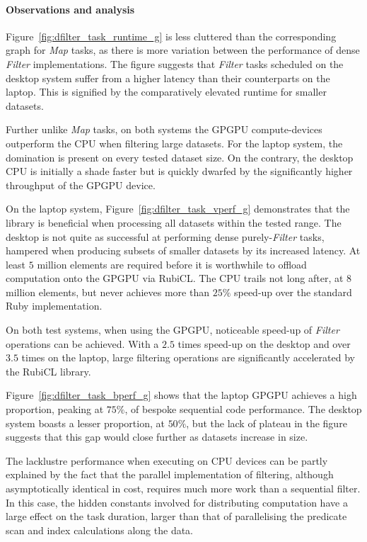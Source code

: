 \paragraph*{Observations and analysis}
Figure~\ref{fig:dfilter_task_runtime_g} is less cluttered than the corresponding graph for \emph{Map} tasks, as there is more variation between the performance of dense \emph{Filter} implementations.
The figure suggests that \emph{Filter} tasks scheduled on the desktop system suffer from a higher latency than their counterparts on the laptop. This is signified by the comparatively elevated runtime for smaller datasets.

Further unlike \emph{Map} tasks, on both systems the \ac{GPGPU} compute-devices outperform the \ac{CPU} when filtering large datasets. For the laptop system, the domination is present on every tested dataset size. On the contrary, the desktop \ac{CPU} is initially a shade faster but is quickly dwarfed by the significantly higher throughput of the \ac{GPGPU} device.

On the laptop system, Figure~\ref{fig:dfilter_task_vperf_g} demonstrates that the library is beneficial when processing all datasets within the tested range. The desktop is not quite as successful at performing dense purely-\emph{Filter} tasks, hampered when producing subsets of smaller datasets by its increased latency. At least $5$ million elements are required before it is worthwhile to offload computation onto the \ac{GPGPU} via RubiCL. The \ac{CPU} trails not long after, at $8$ million elements, but never achieves more than $25\%$ speed-up over the standard Ruby implementation.

On both test systems, when using the \ac{GPGPU}, noticeable speed-up of \emph{Filter} operations can be achieved. With a $2.5$ times speed-up on the desktop and over $3.5$ times on the laptop, large filtering operations are significantly accelerated by the RubiCL library.

Figure~\ref{fig:dfilter_task_bperf_g} shows that the laptop \ac{GPGPU} achieves a high proportion, peaking at $75\%$, of bespoke sequential code performance. The desktop system boasts a lesser proportion, at $50\%$, but the lack of plateau in the figure suggests that this gap would close further as datasets increase in size.

The lacklustre performance when executing on \ac{CPU} devices can be partly explained by the fact that the parallel implementation of filtering, although asymptotically identical in cost, requires much more work than a sequential filter. In this case, the hidden constants involved for distributing computation have a large effect on the task duration, larger than that of parallelising the predicate scan and index calculations along the data.


